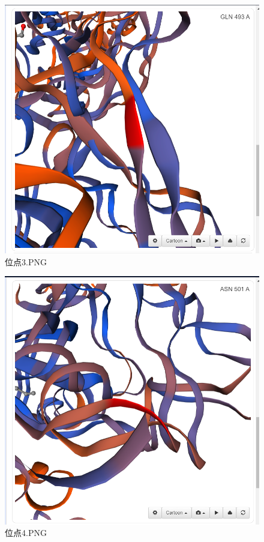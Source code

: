 \documentclass[supercite]{HustGraduPaper}
\begin{document}
		\begin{figure}[H]
			\centering
			\includegraphics[width=1\textwidth]{./material/practice4/ACE2_3.png}
			\caption{位点3.PNG}
		\end{figure}
		\begin{figure}[H]
			\centering
			\includegraphics[width=1\textwidth]{./material/practice4/ACE2_4.png}
			\caption{位点4.PNG}
		\end{figure}
\end{document}
